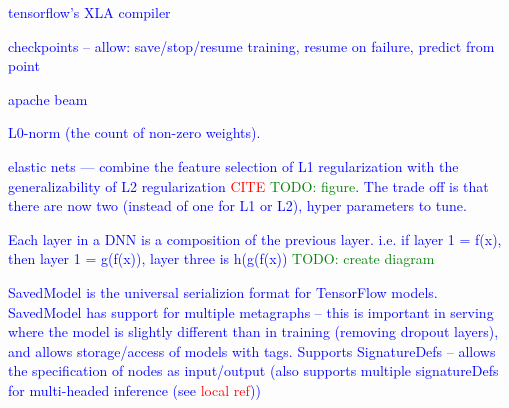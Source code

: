 

\textcolor{blue}{tensorflow's XLA compiler}

\textcolor{blue}{checkpoints -- allow: save/stop/resume training, resume on failure, predict from point}

\textcolor{blue}{apache beam}







\textcolor{blue}{L0-norm (the count of non-zero weights).}


\textcolor{blue}{elastic nets --- combine the feature selection of L1 regularization with the generalizability of L2 regularization \textcolor{red}{CITE} \textcolor{green}{TODO: figure}. The trade off is that there are now two (instead of one for L1 or L2), hyper parameters to tune.}


\textcolor{blue}{Each layer in a DNN is a composition of the previous layer. i.e. if layer 1 = f(x), then layer 1 = g(f(x)), layer three is h(g(f(x)) \textcolor{green}{TODO: create diagram}}



\textcolor{blue}{SavedModel is the universal serializion format for TensorFlow models. SavedModel has support for multiple metagraphs -- this is important in serving where the model is slightly different than in training (removing dropout layers), and allows storage/access of models with tags. Supports SignatureDefs -- allows the specification of nodes as input/output (also supports multiple signatureDefs for multi-headed inference (see \textcolor{red}{local ref}))}


